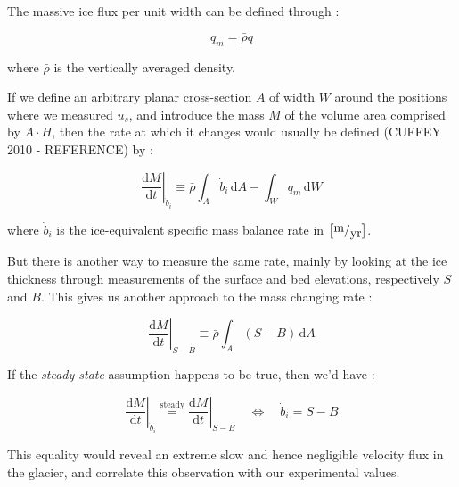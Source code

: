 \documentclass[11pt]{report}
\begin{document}
The massive ice flux per unit width can be defined through :

\[q_m = \bar{\rho}q\]

where $\bar{\rho}$ is the vertically averaged density.

If we define an arbitrary planar cross-section $A$ of width $W$ around the positions where we measured $u_s$, and introduce the mass $M$ of the volume area comprised by $A \cdot H$, then the rate at which it changes would usually be defined (CUFFEY 2010 - REFERENCE) by :
 
\[\left. \frac{\mathrm{d} M}{\mathrm{d}t} \right|_{\dot{b}_i} \equiv \bar{\rho} \int_A \dot{b}_i \, \mathrm{d}A - \int_W q_m \, \mathrm{d} W \]

where $\dot{b}_i$ is the ice-equivalent specific mass balance rate in $\left[ \fraction{m}{yr} \right]$.

But there is another way to measure the same rate, mainly by looking at the ice thickness through measurements of the surface and bed elevations, respectively $S$ and $B$. This gives us another approach to the mass changing rate :

\[\left. \frac{\mathrm{d} M}{\mathrm{d}t} \right|_{S-B} \equiv \bar{\rho} \int_A (S-B) \, \mathrm{d}A\]

If the \textit{steady state} assumption happens to be true, then we'd have :

\[\left. \frac{\mathrm{d} M}{\mathrm{d}t} \right|_{\dot{b}_i} \stackrel{\text{steady}}{=} \left. \frac{\mathrm{d} M}{\mathrm{d}t} \right|_{S-B}
\quad
\Leftrightarrow
\quad
\boxed{\dot{b}_i = S-B}
\]

This equality would reveal an extreme slow and hence negligible velocity flux in the glacier, and correlate this observation with our experimental values.
\end{document}
